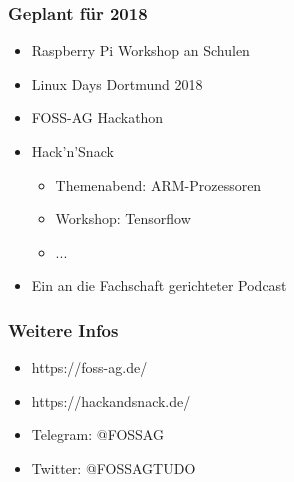 \documentclass[xcolor=table]{beamer}
\begin{document}
\begin{frame}
	\frametitle{Geplant für 2018}
	\begin{itemize}
		\item Raspberry Pi Workshop an Schulen
		\item Linux Days Dortmund 2018
		\item FOSS-AG Hackathon
		\item Hack'n'Snack
		\begin{itemize}
			\item Themenabend: ARM-Prozessoren
			\item Workshop: Tensorflow
			\item ...
		\end{itemize}
		\item Ein an die Fachschaft gerichteter Podcast
	\end{itemize}
\end{frame}

\begin{frame}
	\frametitle{Weitere Infos}
	\begin{itemize}
		\item https://foss-ag.de/
		\item https://hackandsnack.de/
		\item Telegram: @FOSSAG
		\item Twitter: @FOSSAGTUDO
	\end{itemize}
\end{frame}
\end{document}
